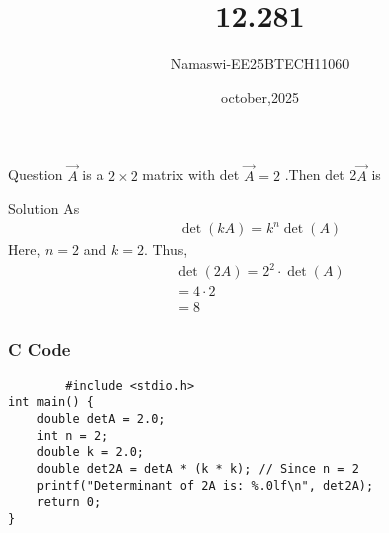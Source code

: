 \documentclass{beamer}
\begin{document}
\title 
{12.281}
\date{october,2025}


\author 
{Namaswi-EE25BTECH11060}
\frame{\titlepage}
\begin{frame}{Question}
$\Vec{A}$ is a $2 \times 2$ matrix with det $\Vec{A}=2$ .Then det 2$\Vec{A}$  is
\end{frame}
\begin{frame}{Solution}
  As
\begin{align}
\det(kA) = k^n \det(A)
\end{align}
Here, $n = 2$ and $k = 2$. Thus,
\begin{align}
\det(2A) = 2^2 \cdot \det(A) \\  = 4 \cdot 2 \\ = 8
\end{align}  
\end{frame}
\begin{frame}[fragile]
    \frametitle{C Code}
    \begin{lstlisting}
        #include <stdio.h>
int main() {
    double detA = 2.0;
    int n = 2;
    double k = 2.0;
    double det2A = detA * (k * k); // Since n = 2
    printf("Determinant of 2A is: %.0lf\n", det2A);
    return 0;
}
\end{lstlisting}
\end{frame}
\end{document}
